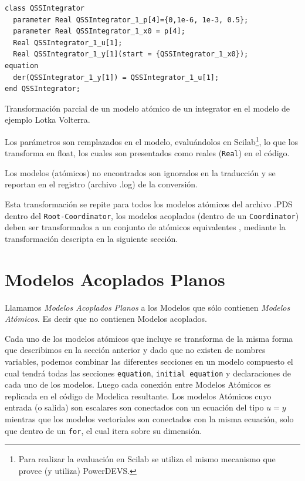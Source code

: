 \begin{listing}[H]
\begin{verbatim}
class QSSIntegrator
  parameter Real QSSIntegrator_1_p[4]={0,1e-6, 1e-3, 0.5};
  parameter Real QSSIntegrator_1_x0 = p[4];
  Real QSSIntegrator_1_u[1];
  Real QSSIntegrator_1_y[1](start = {QSSIntegrator_1_x0});
equation
  der(QSSIntegrator_1_y[1]) = QSSIntegrator_1_u[1];
end QSSIntegrator;
\end{verbatim}
\caption{Transformación parcial de un modelo atómico de un integrator en el modelo de ejemplo Lotka Volterra.}
\end{listing}

        Los parámetros son remplazados en el modelo, evaluándolos en Scilab\footnote{Para realizar la evaluación en Scilab se utiliza el mismo mecanismo que 
        provee (y utiliza) PowerDEVS.}, lo que los transforma en float, los cuales son presentados como reales (\texttt{Real}) en el código.

        Los modelos (atómicos) no encontrados son ignorados en la traducción y se reportan en el registro (archivo .log) de la conversión.

        Esta transformación se repite para todos los modelos atómicos del archivo .PDS dentro del \texttt{Root-Coordinator}, los modelos acoplados 
        (dentro de un \texttt{Coordinator}) deben ser transformados a un conjunto de atómicos equivalentes , mediante la transformación
	descripta en la siguiente sección.

\section{Modelos Acoplados Planos}

        Llamamos \emph{Modelos Acoplados Planos} a los Modelos que sólo contienen \emph{Modelos Atómicos}. Es decir que no contienen Modelos acoplados.

        Cada uno de los modelos atómicos que incluye se transforma de la misma forma que describimos en la sección anterior y dado que no existen  
        de nombres variables, podemos combinar las diferentes secciones en un modelo compuesto el cual tendrá todas las secciones \texttt{equation}, 
	\texttt{initial equation} y declaraciones de cada uno de los modelos.
        Luego cada conexión entre Modelos Atómicos es replicada en el código de Modelica resultante. Los modelos Atómicos cuyo entrada (o salida) 
	son escalares son conectados con un ecuación del tipo $u = y$ mientras que los modelos vectoriales son conectados con la misma ecuación, 
	solo que dentro de un \texttt{for}, el cual itera sobre su dimensión.

